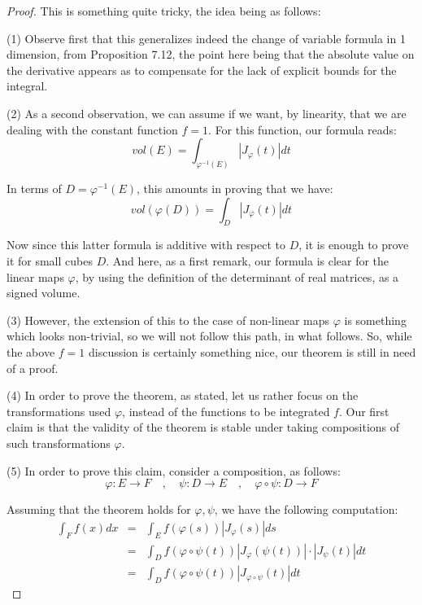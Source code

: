 \documentclass[12pt]{amsbook}
\begin{document}
\begin{proof}
This is something quite tricky, the idea being as follows:

\medskip

(1) Observe first that this generalizes indeed the change of variable formula in 1 dimension, from Proposition 7.12, the point here being that the absolute value on the derivative appears as to compensate for the lack of explicit bounds for the integral.

\medskip 

(2) As a second observation, we can assume if we want, by linearity, that we are dealing with the constant function $f=1$. For this function, our formula reads:
$$vol(E)=\int_{\varphi^{-1}(E)}|J_\varphi(t)|dt$$

In terms of $D={\varphi^{-1}(E)}$, this amounts in proving that we have:
$$vol(\varphi(D))=\int_D|J_\varphi(t)|dt$$

Now since this latter formula is additive with respect to $D$, it is enough to prove it for small cubes $D$. And here, as a first remark, our formula is clear for the linear maps $\varphi$, by using the definition of the determinant of real matrices, as a signed volume.

\medskip

(3) However, the extension of this to the case of non-linear maps $\varphi$ is something which looks non-trivial, so we will not follow this path, in what follows. So, while the above $f=1$ discussion is certainly something nice, our theorem is still in need of a proof.
 
\medskip

(4) In order to prove the theorem, as stated, let us rather focus on the transformations used $\varphi$, instead of the functions to be integrated $f$. Our first claim is that the validity of the theorem is stable under taking compositions of such transformations $\varphi$.

\medskip

(5) In order to prove this claim, consider a composition, as follows:
$$\varphi:E\to F\quad,\quad 
\psi:D\to E\quad,\quad 
\varphi\circ\psi:D\to F$$

Assuming that the theorem holds for $\varphi,\psi$, we have the following computation:
\begin{eqnarray*}
\int_Ff(x)dx
&=&\int_Ef(\varphi(s))|J_\varphi(s)|ds\\
&=&\int_Df(\varphi\circ\psi(t))|J_\varphi(\psi(t))|\cdot|J_\psi(t)|dt\\
&=&\int_Df(\varphi\circ\psi(t))|J_{\varphi\circ\psi}(t)|dt
\end{eqnarray*}


\end{proof}
\end{document}
